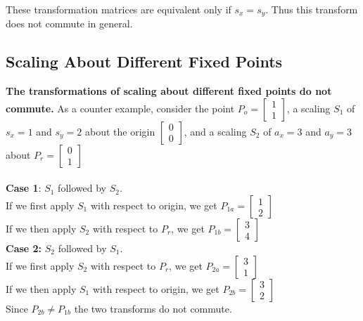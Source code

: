 \documentclass[a4paper,10pt]{scrartcl}
\begin{document}
These transformation matrices are equivalent only if $s_x = s_y$. Thus this transform does not commute in general.

\subsection{Scaling About Different Fixed Points}

{\bfseries The transformations of scaling about different fixed points do not commute.} As a counter example, consider 
the point $P_o = \begin{bmatrix} 1 \\ 1 \end{bmatrix}$, a scaling $S_1$ of $s_x = 1$ and $s_y = 2$ about the origin
$\begin{bmatrix} 0 \\ 0\end{bmatrix}$, and a scaling $S_2$ of $a_x = 3$ and $a_y = 3$ about $P_r = \begin{bmatrix} 0 \\ 1\end{bmatrix}$\\\\


{\bfseries Case 1}: $S_1$ followed by $S_2$.\\
If we first apply $S_1$ with respect to origin, we get $P_{1a} = \begin{bmatrix} 1 \\ 2 \end{bmatrix}$\\
If we then apply $S_2$ with respect to $P_r$, we get $P_{1b} = \begin{bmatrix} 3 \\ 4\end{bmatrix}$\\

{\bfseries Case 2:} $S_2$ followed by $S_1$.\\
If we first apply $S_2$ with respect to $P_r$, we get $P_{2a} = \begin{bmatrix} 3 \\ 1\end{bmatrix}$\\
If we then apply $S_1$ with respect to origin, we get $P_{2b} = \begin{bmatrix} 3 \\ 2\end{bmatrix}$\\

Since $P_{2b} \neq P_{1b}$ the two transforms do not commute.
\end{document}

